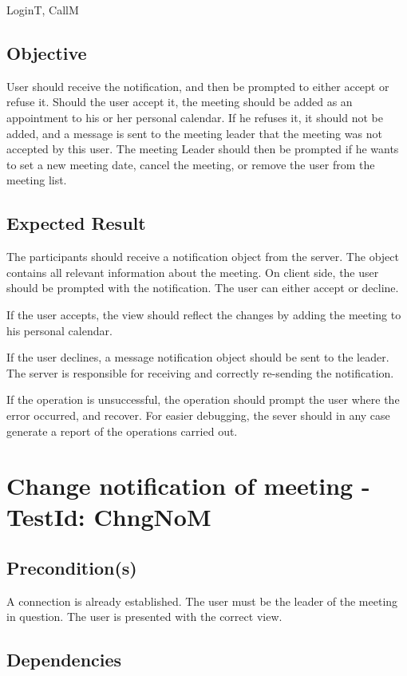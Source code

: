 \documentclass{article}
\begin{document}
LoginT, CallM

\subsection{Objective}

User should receive the notification, and then be prompted to either accept
or refuse it. Should the user accept it, the meeting should be added as an
appointment to his or her personal calendar. If he refuses it, it should not
be added, and a message is sent to the meeting leader that the meeting was
not accepted by this user. The meeting Leader should then be prompted if he
wants to set a new meeting date, cancel the meeting, or remove the user from
the meeting list.

\subsection{Expected Result}

The participants should receive a notification object from the server. The
object contains all relevant information about the meeting. On client side,
the user should be prompted with the notification. The user can either
accept or decline.

If the user accepts, the view should reflect the changes by adding the
meeting to his personal calendar.

If the user declines, a message notification object should be sent to the
leader. The server is responsible for receiving and correctly re-sending the
notification.

If the operation is unsuccessful, the operation should prompt the user where
the error occurred, and recover. For easier debugging, the sever should in
any case generate a report of the operations carried out. \newpage

\section{Change notification of meeting - TestId: ChngNoM}

\subsection{Precondition(s)}

A connection is already established. The user must be the leader of the
meeting in question. The user is presented with the correct view.

\subsection{Dependencies}
\end{document}

